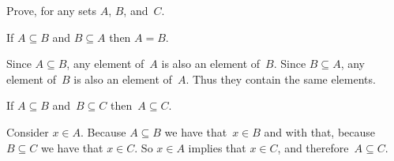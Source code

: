 \documentclass{ibl}  %
\begin{document}
\begin{problem}  \label{ex:PropertiesOfSubset}
Prove, for any sets $A$, $B$, and~$C$.
\begin{exes} 
\begin{exercise} 
  If $A\subseteq B$ and $B\subseteq A$ then $A=B$.
\end{exercise}  
\begin{answer}
   Since $A\subseteq B$, any element of~$A$ is also an element of~$B$.
   Since $B\subseteq A$, any element of~$B$ is also an element of~$A$.
   Thus they contain the same elements.  
\end{answer}
\begin{exercise} 
  If $A\subseteq B$ and~$B\subseteq C$ then~$A\subseteq C$.  
\end{exercise}
\begin{answer}
   Consider $x\in A$.
   Because $A\subseteq B$ we have that~$x\in B$ and with that, because
   $B\subseteq C$ we have that $x\in C$.
   So $x\in A$ implies that $x\in C$, and therefore~$A\subseteq C$.  
\end{answer}
\end{exes}
\end{problem}
\end{document}
